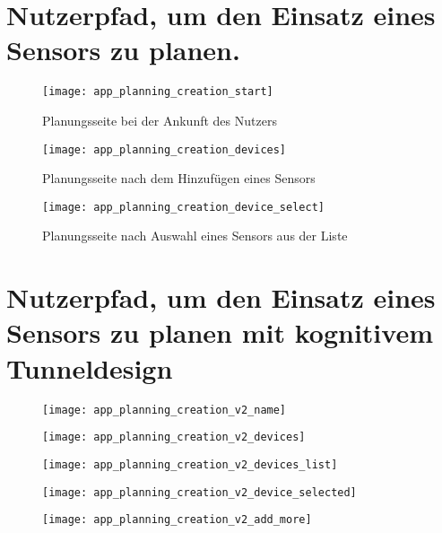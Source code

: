 \section{Nutzerpfad, um den Einsatz eines Sensors zu planen.} \label{appendix:planing_devices_flow}

\begin{figure}[H]
  \centering
  \texttt{[image: app\_planning\_creation\_start]}
  \caption{Planungsseite bei der Ankunft des Nutzers}
  \label{fig:app_planning_creation_start}
\end{figure}
\begin{figure}[H]
  \centering
  \texttt{[image: app\_planning\_creation\_devices]}
  \caption{Planungsseite nach dem Hinzufügen eines Sensors}
  \label{fig:app_planning_creation_devices}
\end{figure}
\begin{figure}[H]
  \centering
  \texttt{[image: app\_planning\_creation\_device\_select]}
  \caption{Planungsseite nach Auswahl eines Sensors aus der Liste}
  \label{fig:app_planning_creation_device_select}
\end{figure}

\section{Nutzerpfad, um den Einsatz eines Sensors zu planen mit kognitivem Tunneldesign} \label{appendix:planing_devices_flow_tunneling}

\begin{figure}[H]
  \centering
  \texttt{[image: app\_planning\_creation\_v2\_name]}
  \caption{}
  \label{fig:app_planning_creation_v2_name}
\end{figure}
\begin{figure}[H]
  \centering
  \texttt{[image: app\_planning\_creation\_v2\_devices]}
  \caption{}
  \label{fig:app_planning_creation_v2_devices}
\end{figure}
\begin{figure}[H]
  \centering
  \texttt{[image: app\_planning\_creation\_v2\_devices\_list]}
  \caption{}
  \label{fig:app_planning_creation_v2_devices_list}
\end{figure}
\begin{figure}[H]
  \centering
  \texttt{[image: app\_planning\_creation\_v2\_device\_selected]}
  \caption{}
  \label{fig:app_planning_creation_v2_device_selected}
\end{figure}
\begin{figure}[H]
  \centering
  \texttt{[image: app\_planning\_creation\_v2\_add\_more]}
  \caption{}
  \label{fig:app_planning_creation_v2_add_more}
\end{figure}